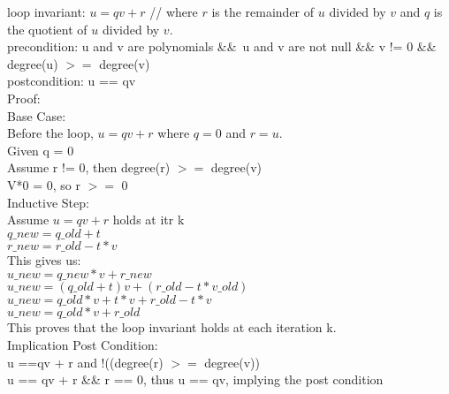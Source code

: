 \documentclass[11pt]{article}
\begin{document}
loop invariant: $u = qv + r$ // where $r$ is the remainder of $u$ divided by $v$ and $q$ is the quotient of $u$ divided by $v$.\\
precondition: u and v are polynomials \&\&\ u and v are not null
\&\& v != 0 \&\& degree(u) $>=$ degree(v)\\
postcondition: u == qv\\

\noindent Proof: \\
\indent Base Case: \\
Before the loop, $u = qv + r$ where $q = 0$ and $r = u$.\\
Given q = 0\\
Assume r != 0, then degree(r) $>=$ degree(v)\\
V*0 = 0, so r $>=$ 0\\

Inductive Step: \\
Assume $u = qv + r$ holds at itr k\\
$q\_new = q\_old + t$\\
$r\_new = r\_old - t * v$\\
This gives us:\\
$u\_new = q\_new * v + r\_new$\\
$u\_new = (q\_old + t)v + (r\_old - t * v\_old)$\\
$u\_new = q\_old * v + t * v + r\_old - t * v$\\
$u\_new = q\_old * v + r\_old$\\

This proves that the loop invariant holds at each iteration k.\\

\noindent Implication Post Condition: \\
u ==qv + r and !((degree(r) $>=$ degree(v))\\
u == qv + r \&\& r == 0, thus u == qv, implying the post condition\\
\end{document}
